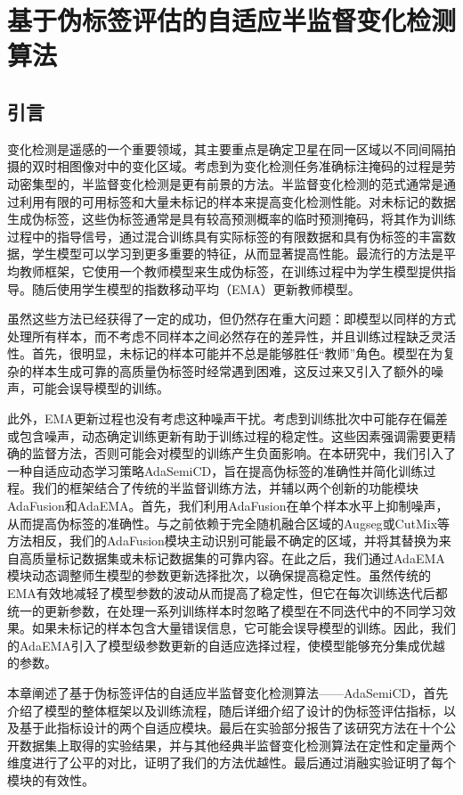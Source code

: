 \documentclass[lang=chs, degree=master, blindreview=false, adobe=false]{yanputhesis}
\begin{document}
\chapter{基于伪标签评估的自适应半监督变化检测算法}
\section{引言}
变化检测是遥感的一个重要领域，其主要重点是确定卫星在同一区域以不同间隔拍摄的双时相图像对中的变化区域。考虑到为变化检测任务准确标注掩码的过程是劳动密集型的，半监督变化检测是更有前景的方法。半监督变化检测的范式通常是通过利用有限的可用标签和大量未标记的样本来提高变化检测性能。对未标记的数据生成伪标签，这些伪标签通常是具有较高预测概率的临时预测掩码，将其作为训练过程中的指导信号，通过混合训练具有实际标签的有限数据和具有伪标签的丰富数据，学生模型可以学习到更多重要的特征，从而显著提高性能。最流行的方法是平均教师\cite{Tarvainen2017teacher}框架，它使用一个教师模型来生成伪标签，在训练过程中为学生模型提供指导。随后使用学生模型的指数移动平均（EMA）更新教师模型。

虽然这些方法已经获得了一定的成功，但仍然存在重大问题：即模型以同样的方式处理所有样本，而不考虑不同样本之间必然存在的差异性，并且训练过程缺乏灵活性。首先，很明显，未标记的样本可能并不总是能够胜任“教师”角色。模型在为复杂的样本生成可靠的高质量伪标签时经常遇到困难，这反过来又引入了额外的噪声，可能会误导模型的训练。

此外，EMA更新过程也没有考虑这种噪声干扰。考虑到训练批次中可能存在偏差或包含噪声，动态确定训练更新有助于训练过程的稳定性。这些因素强调需要更精确的监督方法，否则可能会对模型的训练产生负面影响。在本研究中，我们引入了一种自适应动态学习策略AdaSemiCD，旨在提高伪标签的准确性并简化训练过程。我们的框架结合了传统的半监督训练方法，并辅以两个创新的功能模块AdaFusion和AdaEMA。首先，我们利用AdaFusion在单个样本水平上抑制噪声，从而提高伪标签的准确性。与之前依赖于完全随机融合区域的Augseg\cite{AugSeg}或CutMix\cite{yun2019cutmix}等方法相反，我们的AdaFusion模块主动识别可能最不确定的区域，并将其替换为来自高质量标记数据集或未标记数据集的可靠内容。在此之后，我们通过AdaEMA模块动态调整师生模型的参数更新选择批次，以确保提高稳定性。虽然传统的EMA有效地减轻了模型参数的波动从而提高了稳定性，但它在每次训练迭代后都统一的更新参数，在处理一系列训练样本时忽略了模型在不同迭代中的不同学习效果。如果未标记的样本包含大量错误信息，它可能会误导模型的训练。因此，我们的AdaEMA引入了模型级参数更新的自适应选择过程，使模型能够充分集成优越的参数。

本章阐述了基于伪标签评估的自适应半监督变化检测算法——AdaSemiCD，首先介绍了模型的整体框架以及训练流程，随后详细介绍了设计的伪标签评估指标，以及基于此指标设计的两个自适应模块。最后在实验部分报告了该研究方法在十个公开数据集上取得的实验结果，并与其他经典半监督变化检测算法在定性和定量两个维度进行了公平的对比，证明了我们的方法优越性。最后通过消融实验证明了每个模块的有效性。
\end{document}
